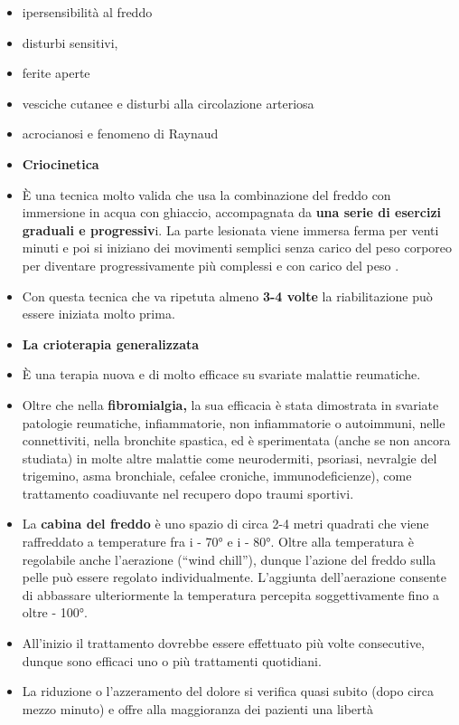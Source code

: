 \documentclass[]{article}
\begin{document}
\begin{itemize}
\item
  ipersensibilità al freddo
\item
  disturbi sensitivi,
\item
  ferite aperte
\item
  vesciche cutanee e disturbi alla circolazione arteriosa
\item
  acrocianosi e fenomeno di Raynaud
\item
  \textbf{Criocinetica}
\item
  È una tecnica molto valida che usa la combinazione del freddo con
  immersione in acqua con ghiaccio, accompagnata da \textbf{una serie di
  esercizi graduali e progressiv}i. La parte lesionata viene immersa
  ferma per venti minuti e poi si iniziano dei movimenti semplici senza
  carico del peso corporeo per diventare progressivamente più complessi
  e con carico del peso .
\item
  Con questa tecnica che va ripetuta almeno \textbf{3-4 volte} la
  riabilitazione può essere iniziata molto prima.
\item
  \textbf{La crioterapia generalizzata}
\item
  È una terapia nuova e di molto efficace su svariate malattie
  reumatiche.
\item
  Oltre che nella \textbf{fibromialgia,} la sua efficacia è stata
  dimostrata in svariate patologie reumatiche, infiammatorie, non
  infiammatorie o autoimmuni, nelle connettiviti, nella bronchite
  spastica, ed è sperimentata (anche se non ancora studiata) in molte
  altre malattie come neurodermiti, psoriasi, nevralgie del trigemino,
  asma bronchiale, cefalee croniche, immunodeficienze), come trattamento
  coadiuvante nel recupero dopo traumi sportivi.
\item
  La \textbf{cabina del freddo} è uno spazio di circa 2-4 metri quadrati
  che viene raffreddato a temperature fra i - 70° e i - 80°. Oltre alla
  temperatura è regolabile anche l'aerazione (``wind chill''), dunque
  l'azione del freddo sulla pelle può essere regolato individualmente.
  L'aggiunta dell'aerazione consente di abbassare ulteriormente la
  temperatura percepita soggettivamente fino a oltre - 100°.
\item
  All'inizio il trattamento dovrebbe essere effettuato più volte
  consecutive, dunque sono efficaci uno o più trattamenti quotidiani.
\item
  La riduzione o l'azzeramento del dolore si verifica quasi subito (dopo
  circa mezzo minuto) e offre alla maggioranza dei pazienti una libertà

\end{itemize}
\end{document}
